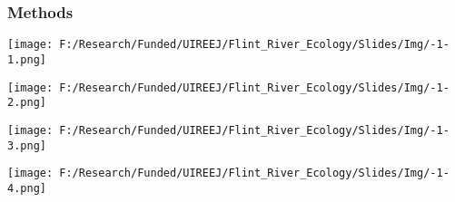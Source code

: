 \documentclass[10pt]{beamer}
\newcommand{\iast}{\item[$\circledast$]}
\begin{document}

\begin{frame}
    \frametitle{Methods} %
    
    \begin{minipage}{0.44\textwidth}
        \begin{center}
          \texttt{[image: F:/Research/Funded/UIREEJ/Flint\_River\_Ecology/Slides/Img/-1-1.png]}
        \end{center}
    \end{minipage} %
      \begin{minipage}{0.55\textwidth}
        \begin{center}
          \texttt{[image: F:/Research/Funded/UIREEJ/Flint\_River\_Ecology/Slides/Img/-1-2.png]}
        \end{center}
    \end{minipage} %
    \begin{minipage}{0.44\textwidth}
        \begin{center}
          \texttt{[image: F:/Research/Funded/UIREEJ/Flint\_River\_Ecology/Slides/Img/-1-3.png]}
        \end{center}
    \end{minipage} %
      \begin{minipage}{0.55\textwidth}
        \begin{center}
          \texttt{[image: F:/Research/Funded/UIREEJ/Flint\_River\_Ecology/Slides/Img/-1-4.png]}
        \end{center}
    \end{minipage} 
\end{frame}
\end{document}
